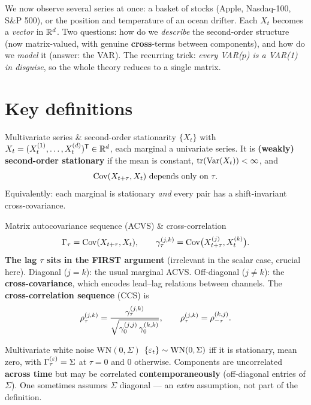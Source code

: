 \documentclass[11pt]{article}
\begin{document}

We now observe several series at once: a basket of stocks (Apple, Nasdaq-100, S\&P 500), or the position and temperature of an ocean drifter. Each $X_t$ becomes a \emph{vector} in $\mathbb{R}^d$. Two questions: how do we \emph{describe} the second-order structure (now matrix-valued, with genuine \textbf{cross}-terms between components), and how do we \emph{model} it (answer: the VAR). The recurring trick: \emph{every VAR($p$) is a VAR(1) in disguise}, so the whole theory reduces to a single matrix.

\section*{Key definitions}

\begin{defn}{Multivariate series \& second-order stationarity}
$\{X_t\}$ with $X_t=(X_t^{(1)},\dots,X_t^{(d)})^{\mathsf{T}}\in\mathbb{R}^d$, each marginal a univariate series. It is \textbf{(weakly) second-order stationary} if the mean is constant, $\operatorname{tr}(\operatorname{Var}(X_t))<\infty$, and
\[
\operatorname{Cov}(X_{t+\tau},X_t)\ \text{depends only on }\tau .
\]
Equivalently: each marginal is stationary \emph{and} every pair has a shift-invariant cross-covariance.
\end{defn}

\begin{defn}{Matrix autocovariance sequence (ACVS) \& cross-correlation}
\[
\Gamma_\tau=\operatorname{Cov}(X_{t+\tau},X_t),\qquad
\gamma_\tau^{(j,k)}=\operatorname{Cov}\!\big(X_{t+\tau}^{(j)},X_t^{(k)}\big).
\]
\textbf{The lag $\tau$ sits in the FIRST argument} (irrelevant in the scalar case, crucial here). Diagonal ($j=k$): the usual marginal ACVS. Off-diagonal ($j\ne k$): the \textbf{cross-covariance}, which encodes lead--lag relations between channels. The \textbf{cross-correlation sequence} (CCS) is
\[
\rho_\tau^{(j,k)}=\frac{\gamma_\tau^{(j,k)}}{\sqrt{\gamma_0^{(j,j)}\,\gamma_0^{(k,k)}}},\qquad \rho_\tau^{(j,k)}=\rho_{-\tau}^{(k,j)} .
\]
\end{defn}

\begin{defn}{Multivariate white noise $\mathrm{WN}(0,\Sigma)$}
$\{\varepsilon_t\}\sim\mathrm{WN}(0,\Sigma)$ iff it is stationary, mean zero, with $\Gamma_\tau^{(\varepsilon)}=\Sigma$ at $\tau=0$ and $0$ otherwise. Components are uncorrelated \textbf{across time} but may be correlated \textbf{contemporaneously} (off-diagonal entries of $\Sigma$). One sometimes assumes $\Sigma$ diagonal --- an \emph{extra} assumption, not part of the definition.
\end{defn}
\end{document}
